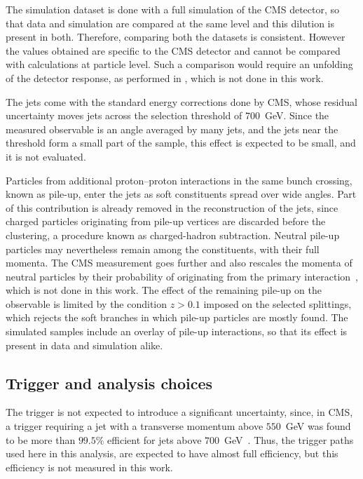 The simulation dataset is done with a full simulation of the CMS detector, so that data and simulation
are compared at the same level and this dilution is present in both. Therefore, comparing 
both the datasets is consistent. However the values obtained
are specific to the CMS detector and cannot be compared with calculations
at particle level. Such a comparison would require an unfolding of the detector
response, as performed in \cite{CMS:2026jnt}, which is not done in this work.

The jets come with the standard energy corrections done by CMS, whose residual uncertainty
moves jets across the selection threshold of $700$~GeV. Since the measured observable
is an angle averaged by many jets, and the jets near the threshold form a small part of
the sample, this effect is expected to be small, and it is not evaluated.

Particles from additional proton--proton interactions in the same bunch crossing,
known as pile-up, enter the jets as soft constituents spread over wide angles.
Part of this contribution is already removed in the reconstruction of the jets,
since charged particles originating from pile-up vertices are discarded before the
clustering, a procedure known as charged-hadron subtraction. Neutral pile-up
particles may nevertheless remain among the constituents, with their full momenta.
The CMS measurement goes further and also rescales the momenta of neutral
particles by their probability of originating from the primary
interaction~\cite{CMS:2026jnt}, which is not done in this work. The effect of the
remaining pile-up on the observable is limited by the condition $z > 0.1$ imposed
on the selected splittings, which rejects the soft branches in which pile-up
particles are mostly found. The simulated samples include an overlay of pile-up
interactions, so that its effect is present in data and simulation alike.

\subsection{Trigger and analysis choices}
\label{sec:sys-choices}

The trigger is not expected to introduce a significant uncertainty, since, in CMS,
a trigger requiring a jet with a transverse momentum above $550$~GeV
was found to be more than $99.5\%$ efficient for jets above
$700$~GeV~\cite{CMS:2026jnt}. Thus, the trigger paths used here in this analysis, are expected
to have almost full efficiency, but this efficiency is not measured in this work.

